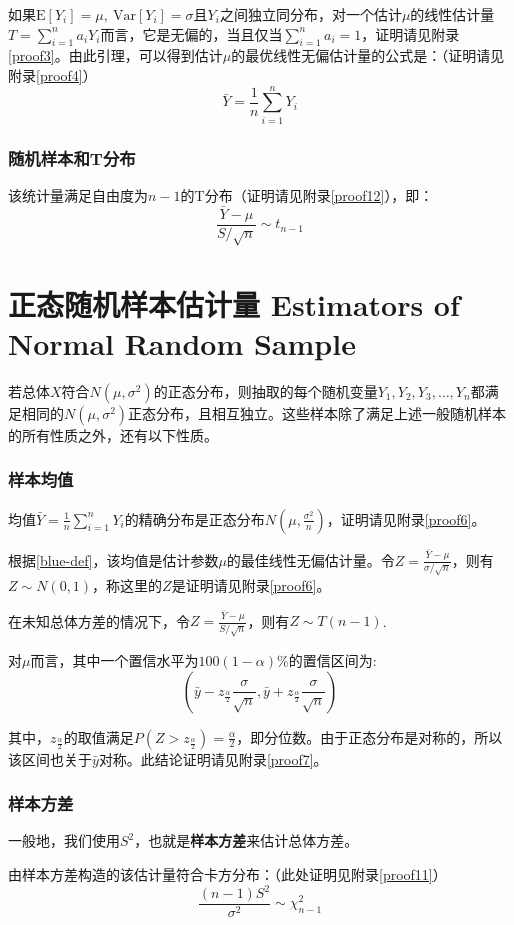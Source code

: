 \documentclass[UTF8]{ctexbook}
\begin{document}
如果$\mathrm{E}[Y_i]=\mu,\ \mathrm{Var}[Y_i]=\sigma$且$Y_i$之间独立同分布，对一个估计$\mu$的线性估计量$T=\sum_{i=1}^na_iY_i$而言，它是无偏的，当且仅当$\sum_{i=1}^na_i=1$，证明请见附录\ref{proof3}。由此引理，可以得到估计$\mu$的最优线性无偏估计量的公式是：（证明请见附录\ref{proof4}）
\[
	\bar{Y}=\frac{1}{n}\sum_{i=1}^nY_i
\]

\subsubsection{随机样本和T分布}
该统计量满足自由度为$n-1$的T分布（证明请见附录\ref{proof12}），即：
\[
	\frac{\bar Y-\mu}{S/\sqrt{n}}\sim t_{n-1}
\]
\section{正态随机样本估计量 Estimators of Normal Random Sample}
若总体$X$符合$N(\mu,\sigma^2)$的正态分布，则抽取的每个随机变量$Y_1,Y_2,Y_3,\dots,Y_n$都满足相同的$N(\mu,\sigma^2)$正态分布，且相互独立。这些样本除了满足上述一般随机样本的所有性质之外，还有以下性质。

\subsubsection{样本均值}
均值$\bar Y=\frac{1}{n}\sum_{i=1}^nY_i$的精确分布是正态分布$N(\mu,\frac{\sigma^2}{n})$，证明请见附录\ref{proof6}。

根据\ref{blue-def}，该均值是估计参数$\mu$的最佳线性无偏估计量。令$Z=\frac{\bar{Y}-\mu}{\sigma/\sqrt n}$，则有$Z\sim N(0,1)$，称这里的$Z$是证明请见附录\ref{proof6}。

在未知总体方差的情况下，令$Z=\frac{\bar{Y}-\mu}{S/\sqrt n}$，则有$Z\sim T(n-1)$.

对$\mu$而言，其中一个置信水平为$100(1-\alpha)\%$的置信区间为:
\[
	\left(\bar y-z_{\frac{\alpha}{2}}\frac{\sigma}{\sqrt n},\bar y+z_{\frac{\alpha}{2}}\frac{\sigma}{\sqrt n}\right)
\]

其中，$z_{\frac{\alpha}{2}}$的取值满足$P(Z>z_\frac{\alpha}{2})=\frac{\alpha}{2}$，即分位数。由于正态分布是对称的，所以该区间也关于$\bar y$对称。此结论证明请见附录\ref{proof7}。
\subsubsection{样本方差}
一般地，我们使用$S^2$，也就是\textbf{样本方差}来估计总体方差。

由样本方差构造的该估计量符合卡方分布：（此处证明见附录\ref{proof11}）
\[
	\frac{(n-1)S^2}{\sigma^2}\sim\chi_{n-1}^2 
\]
\end{document}
